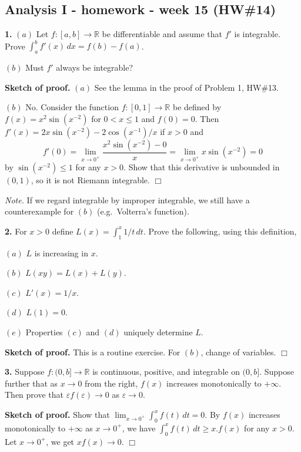\documentclass{article}
\begin{document}
    
    
    
    
    

    
    \subsection*{Analysis I - homework - week 15
(HW\#14)}\label{analysis-i---homework---week-15-hw14}

    \textbf{1.} $(a)$ Let $f : [a, b] \to \mathbb{R}$ be differentiable and
assume that $f'$ is integrable. Prove
$\int_a^b f'(x)\,dx = f (b) − f(a)$.

$(b)$ Must $f'$ always be integrable?

    \textbf{Sketch of proof.} $(a)$ See the lemma in the proof of Problem 1,
HW\#13.

$(b)$ No. Consider the function $f:[0,1]\to \mathbb{R}$ be defined by
$f(x) = x^2 \sin(x^{-2}) $ for $0 < x \le 1$ and $f(0) = 0$. Then
$f'(x) = 2x\sin(x^{-2}) -2\cos (x^{-1})/x$ if $x>0$ and
\[f'(0) = \lim_{x\to 0^+}\frac{ x^2\sin(x^{-2}) - 0}{x} =  \lim_{x\to 0^+} x\sin (x^{-2}) = 0\]
by $\sin (x^{-2}) \le 1$ for any $x > 0$. Show that this derivative is
unbounded in $(0,1)$, so it is not Riemann integrable. $\Box$

\emph{Note.} If we regard integrable by improper integrable, we still
have a counterexample for $(b)$ (e.g.~Volterra's function).

    \textbf{2.} For $x > 0$ define $L(x) = \int_1^x 1/t \,dt$. Prove the
following, using this definition,

$(a)$ $L$ is increasing in $x$.

$(b)$ $L(xy) = L(x) + L(y)$.

$(c)$ $L'(x) = 1/x$.

$(d)$ $L(1) = 0$.

$(e)$ Properties $(c)$ and $(d)$ uniquely determine $L$.

    \textbf{Sketch of proof.} This is a routine exercise. For $(b)$, change
of variables. $\Box$

    \textbf{3.} Suppose $f : (0, b] \to \mathbb{R}$ is continuous, positive,
and integrable on $(0, b]$. Suppose further that as $x \to 0$ from the
right, $f (x)$ increases monotonically to $+\infty$. Then prove that
$\varepsilon f (\varepsilon) \to 0$ as $\varepsilon \to 0$.

    \textbf{Sketch of proof.} Show that
$\lim_{x\to 0^+} \int_0^x f(t)\,dt = 0$. By $f(x)$ increases
monotonically to $+\infty$ as $x\to 0^+$, we have
$\int_0^x f(t)\,dt \ge x.f(x)$ for any $x > 0$. Let $x \to 0^+$, we get
$xf(x) \to 0$. $\Box$
\end{document}

